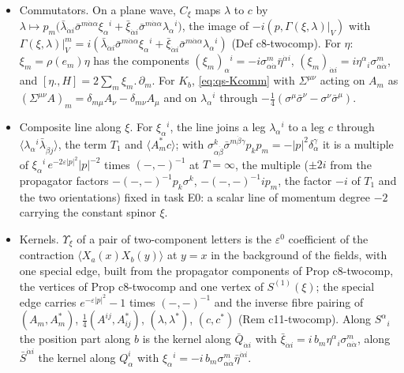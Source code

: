 \begin{remark}
\begin{itemize}
\item Commutators. On a plane wave, $C_\xi$ maps $\lambda$ to $c$ by $\lambda\mapsto p_m\big(\bar\lambda_{\dot\alpha i}\bar\sigma^{m\dot\alpha\alpha}\xi_\alpha{}^i+\bar\xi_{\dot\alpha i}\bar\sigma^{m\dot\alpha\alpha}\lambda_\alpha{}^i\big)$, the image of $-i(p,\Gamma(\xi,\lambda)|_V)$ with $\Gamma(\xi,\lambda)|_V^m=i(\bar\lambda_{\dot\alpha i}\bar\sigma^{m\dot\alpha\alpha}\xi_\alpha{}^i+\bar\xi_{\dot\alpha i}\bar\sigma^{m\dot\alpha\alpha}\lambda_\alpha{}^i)$ (Def c8-twocomp). For $\eta$: $\xi_m=\rho(e_m)\eta$ has the components $(\xi_m)_\alpha{}^i=-i\sigma^m_{\alpha\dot\alpha}\bar\eta^{\dot\alpha i}$, $(\xi_m)_{\dot\alpha i}=i\eta^\alpha{}_i\sigma^m_{\alpha\dot\alpha}$, and $[\eta.,H]=2\sum_m\xi_m.\,\partial_m$. For $K_b$, \eqref{eq:qs-Kcomm} with $\Sigma^{\mu\nu}$ acting on $A_m$ as $(\Sigma^{\mu\nu}A)_m=\delta_{m\mu}A_\nu-\delta_{m\nu}A_\mu$ and on $\lambda_\alpha{}^i$ through $-\tfrac14(\sigma^\mu\bar\sigma^\nu-\sigma^\nu\bar\sigma^\mu)$.
\item Composite line along $\xi$. For $\xi_\alpha{}^i$, the line joins a leg $\lambda_\alpha{}^i$ to a leg $c$ through $\langle\lambda_\alpha{}^i\bar\lambda_{\dot\beta j}\rangle$, the term $T_1$ and $\langle A^*_mc\rangle$; with $\sigma^k_{\alpha\dot\beta}\bar\sigma^{m\dot\beta\gamma}p_kp_m=-|p|^2\delta_\alpha^\gamma$ it is a multiple of $\xi_\alpha{}^i\,e^{-2\varepsilon|p|^2}|p|^{-2}$ times $(-,-)^{-1}$ at $T=\infty$, the multiple ($\pm2i$ from the propagator factors $-(-,-)^{-1}p_k\sigma^k$, $-(-,-)^{-1}ip_m$, the factor $-i$ of $T_1$ and the two orientations) fixed in task E0: a scalar line of momentum degree $-2$ carrying the constant spinor $\xi$.
\item Kernels. $\Upsilon_\xi$ of a pair of two-component letters is the $\varepsilon^0$ coefficient of the contraction $\langle X_a(x)X_b(y)\rangle$ at $y=x$ in the background of the fields, with one special edge, built from the propagator components of Prop c8-twocomp, the vertices of Prop c8-twocomp and one vertex of $S^{(1)}(\xi)$; the special edge carries $e^{-\varepsilon|p|^2}-1$ times $(-,-)^{-1}$ and the inverse fibre pairing of $(A_m,A^*_m)$, $\tfrac14(A^{ij},A^*_{ij})$, $(\lambda,\lambda^*)$, $(c,c^*)$ (Rem c11-twocomp). Along $S^\alpha{}_i$ the position part along $b$ is the kernel along $\bar Q_{\dot\alpha i}$ with $\bar\xi_{\dot\alpha i}=i\,b_m\eta^\alpha{}_i\sigma^m_{\alpha\dot\alpha}$, along $\bar S^{\dot\alpha i}$ the kernel along $Q^i_\alpha$ with $\xi_\alpha{}^i=-i\,b_m\sigma^m_{\alpha\dot\alpha}\bar\eta^{\dot\alpha i}$.

\end{itemize}
\end{remark}
